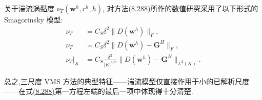 \begin{note}[附加涡黏度的选取]
\label{note:vms-coarse-projection-viscosity-choice}
关于湍流涡黏度 $\nu_T(\bm w^h,r^h,h)$,\textcite{JohnKaya2005,JohnRoland2007,JohnKindl2010a,JohnKindl2010b,RoeheLube2010} 对方法\hyperref[eq:vms-coarse-projection-three-scale-method]{(8.288)}所作的数值研究采用了以下形式的 Smagorinsky 模型:
\begin{align}
 \nu_T&=C_S\delta^2\|D(\bm w^h)\|_F,
 \label{eq:vms-coarse-projection-smagorinsky-all}\\
 \nu_T&=C_S\delta^2\|D(\bm w^h)-\bm G^H\|_F,
 \label{eq:vms-coarse-projection-smagorinsky-projected}\\
 \nu_T|_K&=C_S\frac{\delta^2}{|K|^{1/2}}
 \|D(\bm w^h)-\bm G^H\|_{L^2(K)}.
 \label{eq:vms-coarse-projection-smagorinsky-local}
\end{align}

总之,三尺度 VMS 方法的典型特征——湍流模型仅直接作用于小的已解析尺度——在式\hyperref[eq:vms-coarse-projection-three-scale-method]{(8.288)}第一方程左端的最后一项中体现得十分清楚.
\end{note}

